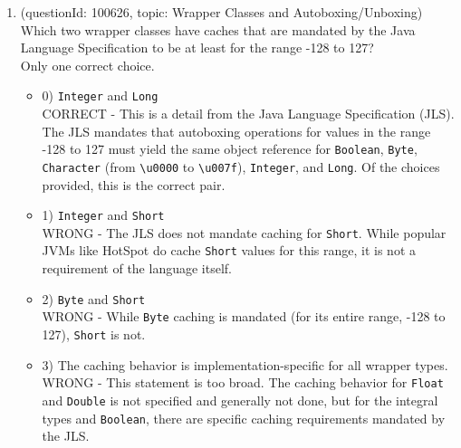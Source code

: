\documentclass[12pt]{article}
\begin{document}
\begin{enumerate}[label=(\arabic*)]
\begin{itemize}
\end{itemize}
\item (questionId: 100626, topic: Wrapper Classes and Autoboxing/Unboxing) \\ 
Which two wrapper classes have caches that are mandated by the Java Language Specification to be at least for the range -128 to 127?
\\ \noindent Only one correct choice. 
\begin{itemize}
\item 0) \verb|Integer| and \verb|Long|
 \\ 
CORRECT - This is a detail from the Java Language Specification (JLS). The JLS mandates that autoboxing operations for values in the range -128 to 127 must yield the same object reference for \verb|Boolean|, \verb|Byte|, \verb|Character| (from \verb|\u0000| to \verb|\u007f|), \verb|Integer|, and \verb|Long|. Of the choices provided, this is the correct pair.

\item 1) \verb|Integer| and \verb|Short|
 \\ 
WRONG - The JLS does not mandate caching for \verb|Short|. While popular JVMs like HotSpot do cache \verb|Short| values for this range, it is not a requirement of the language itself.

\item 2) \verb|Byte| and \verb|Short|
 \\ 
WRONG - While \verb|Byte| caching is mandated (for its entire range, -128 to 127), \verb|Short| is not.

\item 3) The caching behavior is implementation-specific for all wrapper types.
 \\ 
WRONG - This statement is too broad. The caching behavior for \verb|Float| and \verb|Double| is not specified and generally not done, but for the integral types and \verb|Boolean|, there are specific caching requirements mandated by the JLS.


\end{itemize}
\end{enumerate}
\end{document}
